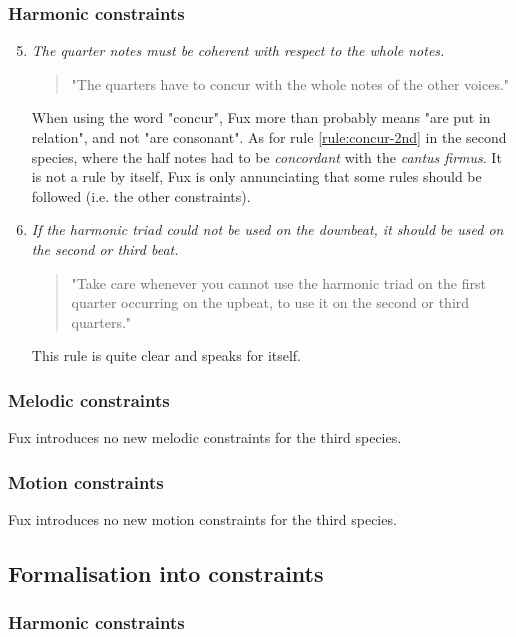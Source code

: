 \subsubsection{Harmonic constraints}
\begin{enumerate}[wide, label=\bfseries 3.H\arabic*]
\setcounter{enumi}{4}
    \item \textit{The quarter notes must be coherent with respect to the whole notes.} \label{rule:concur-3rd}    
    \begin{quotation}
        "The quarters have to concur with the whole notes of the other voices."
        \textcite[p.91]{GaPEng}
    \end{quotation}
    When using the word "concur", Fux more than probably means "are put in relation", and not "are consonant". As for rule \ref{rule:concur-2nd} in the second species, where the half notes had to be \textit{concordant} with the \textit{cantus firmus}. It is not a rule by itself, Fux is only annunciating that some rules should be followed (i.e. the other constraints).

    \item \textit{If the harmonic triad could not be used on the downbeat, it should be used on the second or third beat.} \label{rule:coherent}    
    \begin{quotation}
        "Take care whenever you cannot use the harmonic triad on the first quarter occurring on the upbeat, to use it on the second or third quarters."
        \textcite[p.91]{GaPEng}
    \end{quotation}

    This rule is quite clear and speaks for itself.
\end{enumerate}

\subsubsection{Melodic constraints}
Fux introduces no new melodic constraints for the third species.
\subsubsection{Motion constraints}
Fux introduces no new motion constraints for the third species.

\subsection{Formalisation into constraints}
\subsubsection{Harmonic constraints}

